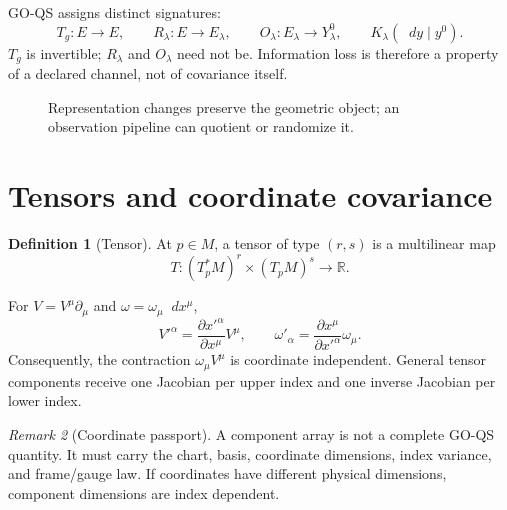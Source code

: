 \documentclass[11pt,a4paper]{article}
\theoremstyle{definition}
\newtheorem{definition}{Definition}[section]
\theoremstyle{plain}
\theoremstyle{remark}
\newtheorem{remark}[definition]{Remark}
\newcommand{\R}{\mathbb{R}}
\newcommand{\dd}{\mathop{}\!d}
\begin{document}
GO-QS assigns distinct signatures:
\[
T_g:E\to E,\qquad
R_\lambda:E\to E_\lambda,\qquad
O_\lambda:E_\lambda\to Y_\lambda^0,\qquad
K_\lambda(\dd y\mid y^0).
\]
$T_g$ is invertible; $R_\lambda$ and $O_\lambda$ need not be. Information
loss is therefore a property of a declared channel, not of covariance
itself.

\begin{figure}[htbp]
\centering
{}
\caption{Representation changes preserve the geometric object; an observation
pipeline can quotient or randomize it.}
\end{figure}

\section{Tensors and coordinate covariance}

\begin{definition}[Tensor]
At $p\in M$, a tensor of type $(r,s)$ is a multilinear map
\[
T:(T_p^*M)^r\times(T_pM)^s\to\R.
\]
\end{definition}

For $V=V^\mu\partial_\mu$ and
$\omega=\omega_\mu\dd x^\mu$,
\[
V'^\alpha
=\frac{\partial x'^\alpha}{\partial x^\mu}V^\mu,
\qquad
\omega'_\alpha
=\frac{\partial x^\mu}{\partial x'^\alpha}\omega_\mu.
\]
Consequently, the contraction $\omega_\mu V^\mu$ is coordinate
independent. General tensor components receive one Jacobian per upper
index and one inverse Jacobian per lower index.

\begin{remark}[Coordinate passport]
A component array is not a complete GO-QS quantity. It must carry the
chart, basis, coordinate dimensions, index variance, and frame/gauge law.
If coordinates have different physical dimensions, component dimensions
are index dependent.
\end{remark}
\end{document}

